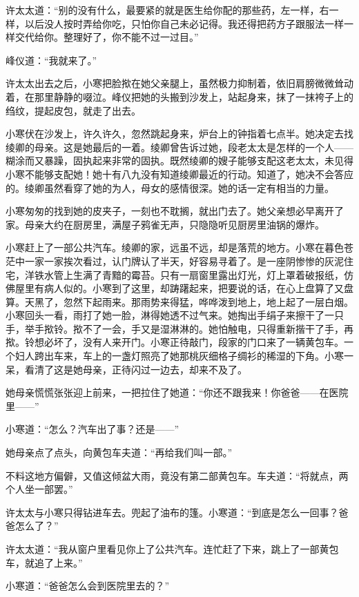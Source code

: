 \par 许太太道：“别的没有什么，最要紧的就是医生给你配的那些药，左一样，右一样，以后没人按时弄给你吃，只怕你自己未必记得。我还得把药方子跟服法一样一样交代给你。整理好了，你不能不过一过目。”
\par 峰仪道：“我就来了。”
\par 许太太出去之后，小寒把脸揿在她父亲腿上，虽然极力抑制着，依旧肩膀微微耸动着，在那里静静的啜泣。峰仪把她的头搬到沙发上，站起身来，抹了一抹袴子上的绉纹，提起皮包，就走了出去。
\par 小寒伏在沙发上，许久许久，忽然跳起身来，炉台上的钟指着七点半。她决定去找绫卿的母亲。这是她最后的一着。绫卿曾告诉过她，段老太太是怎样的一个人——糊涂而又暴躁，固执起来非常的固执。既然绫卿的嫂子能够支配这老太太，未见得小寒不能够支配她！她十有八九没有知道绫卿最近的行动。知道了，她决不会答应的。绫卿虽然看穿了她的为人，母女的感情很深。她的话一定有相当的力量。
\par 小寒匆匆的找到她的皮夹子，一刻也不耽搁，就出门去了。她父亲想必早离开了家。母亲大约在厨房里，满屋子鸦雀无声，只隐隐听见厨房里油锅的爆炸。
\par 小寒赶上了一部公共汽车。绫卿的家，远虽不远，却是落荒的地方。小寒在暮色苍茫中一家一家挨次看过，认门牌认了半天，好容易寻着了。是一座阴惨惨的灰泥住宅，洋铁水管上生满了青黯的霉苔。只有一扇窗里露出灯光，灯上罩着破报纸，仿佛屋里有病人似的。小寒到了这里，却踌躇起来，把要说的话，在心上盘算了又盘算。天黑了，忽然下起雨来。那雨势来得猛，哗哗泼到地上，地上起了一层白烟。小寒回头一看，雨打了她一脸，淋得她透不过气来。她掏出手绢子来擦干了一只手，举手揿铃。揿不了一会，手又是湿淋淋的。她怕触电，只得重新揩干了手，再揿。铃想必坏了，没有人来开门。小寒正待敲门，段家的门口来了一辆黄包车。一个妇人跨出车来，车上的一盏灯照亮了她那桃灰细格子绸衫的稀湿的下角。小寒一呆，看清了这是她母亲，正待闪过一边去，却来不及了。
\par 她母亲慌慌张张迎上前来，一把拉住了她道：“你还不跟我来！你爸爸——在医院里——”
\par 小寒道：“怎么？汽车出了事？还是——”
\par 她母亲点了点头，向黄包车夫道：“再给我们叫一部。”
\par 不料这地方偏僻，又值这倾盆大雨，竟没有第二部黄包车。车夫道：“将就点，两个人坐一部罢。”
\par 许太太与小寒只得钻进车去。兜起了油布的篷。小寒道：“到底是怎么一回事？爸爸怎么了？”
\par 许太太道：“我从窗户里看见你上了公共汽车。连忙赶了下来，跳上了一部黄包车，就追了上来。”
\par 小寒道：“爸爸怎么会到医院里去的？”
